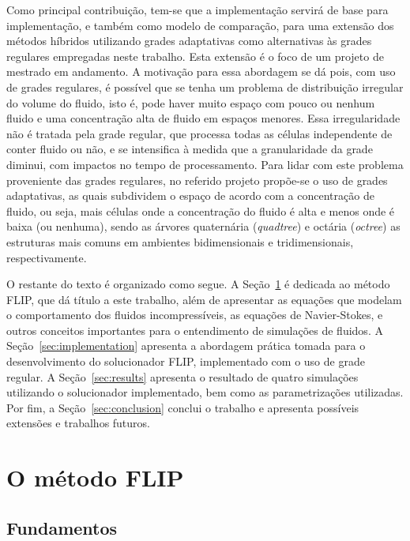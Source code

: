 \documentclass[12pt,a4paper,dvipsnames]{article}
\newcommand{\secref}[1]{Seção~\ref{#1}}
\begin{document}
Como principal contribuição, tem-se que a implementação servirá de base para implementação, e também como modelo de comparação, para uma extensão dos métodos híbridos utilizando grades adaptativas como alternativas às grades regulares empregadas neste trabalho. Esta extensão é o foco de um projeto de mestrado em andamento. A motivação para essa abordagem se dá pois, com uso de grades regulares, é possível que se tenha um problema de distribuição irregular do volume do fluido, isto é, pode haver muito espaço com pouco ou nenhum fluido e uma concentração alta de fluido em espaços menores. Essa irregularidade não é tratada pela grade regular, que processa todas as células independente de conter fluido ou não, e se intensifica à medida que a granularidade da grade diminui, com impactos no tempo de processamento. Para lidar com este problema proveniente das grades regulares, no referido projeto propõe-se o uso de grades adaptativas, as quais subdividem o espaço de acordo com a concentração de fluido, ou seja, mais células onde a concentração do fluido é alta e menos onde é baixa (ou nenhuma), sendo as árvores quaternária (\textit{quadtree}) e octária (\textit{octree}) as estruturas mais comuns em ambientes bidimensionais e tridimensionais, respectivamente.

O restante do texto é organizado como segue. A \secref{sec:flipmethod} é dedicada ao método FLIP, que dá título a este trabalho, além de apresentar as equações que modelam o comportamento dos fluidos incompressíveis, as equações de Navier-Stokes, e outros conceitos importantes para o entendimento de simulações de fluidos. A \secref{sec:implementation} apresenta a abordagem prática tomada para o desenvolvimento do solucionador FLIP, implementado com o uso de grade regular. A \secref{sec:results} apresenta o resultado de quatro simulações utilizando o solucionador implementado, bem como as parametrizações utilizadas. Por fim, a \secref{sec:conclusion} conclui o trabalho e apresenta possíveis extensões e trabalhos futuros.

\section{O método FLIP}
\label{sec:flipmethod}


\subsection{Fundamentos}
\label{ssec:fundamentals}
\end{document}
